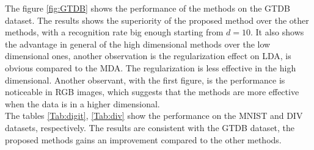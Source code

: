 \documentclass{siamltex}
\begin{document}
\begin{table}[H]
\centering
{}
\caption{Performance of methods per different subspace dimension on the DIV dataset.}
\label{Tab:div}
\end{table}

\noindent
The figure \ref{fig:GTDB} shows the performance of the methods on the GTDB dataset. The results shows the superiority of the proposed method over the other methods, with a recognition rate big enough starting from $d=10$. It also shows the advantage in general of the high dimensional methods over the low dimensional ones, another observation is the regularization effect on LDA, is obvious compared to the MDA. The regularization is less effective in the high dimensional.
Another observant, with the first figure, is the performance is noticeable in RGB images, which suggests that the methods are more effective when the data is in a higher dimensional.\\
The tables \ref{Tab:digit}, \ref{Tab:div} show the performance on the MNIST and DIV datasets, respectively. The results are consistent with the GTDB dataset, the proposed methods gains an improvement compared to the other methods.
\end{document}
